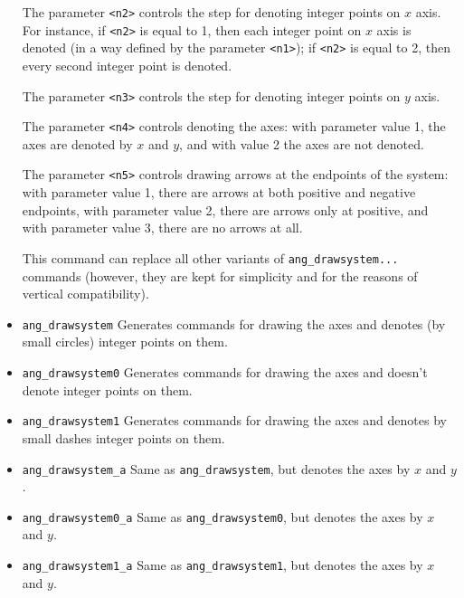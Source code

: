 \documentclass[a4paper]{book}
\begin{document}
\begin{itemize}
        The parameter \verb|<n2>| controls the step for denoting integer points
        on $x$ axis. For instance, if \verb|<n2>| is equal to 1, then each integer
        point on $x$ axis is denoted (in a way defined by the parameter \verb|<n1>|);
        if \verb|<n2>| is equal to 2, then every second integer point is denoted.

        The parameter \verb|<n3>| controls the step for denoting integer points
        on $y$ axis.

        The parameter \verb|<n4>| controls denoting the axes:
        with parameter value 1, the axes are denoted by $x$ and $y$,
        and with value 2 the axes are not denoted.

        The parameter \verb|<n5>| controls drawing arrows at the endpoints of the system:
        with parameter value 1, there are arrows at both positive and negative endpoints,
        with parameter value 2, there are arrows only at positive,
        and with parameter value 3, there are no arrows at all.

        This command can replace all other variants of \verb|ang_drawsystem...| commands
        (however, they are kept for simplicity and for the reasons of vertical compatibility).

\item
\verb|ang_drawsystem|
        Generates commands for drawing the axes and denotes (by small circles)
        integer points on them.

\item
\verb|ang_drawsystem0|
        Generates commands for drawing the axes and doesn't denote
        integer points on them.

\item
\verb|ang_drawsystem1|
        Generates commands for drawing the axes and denotes by small dashes
        integer points on them.

\item
\verb|ang_drawsystem_a|
        Same as \verb|ang_drawsystem|, but denotes the axes by $x$ and $y$.

\item
\verb|ang_drawsystem0_a|
        Same as \verb|ang_drawsystem0|, but denotes the axes by $x$ and $y$.

\item
\verb|ang_drawsystem1_a|
        Same as \verb|ang_drawsystem1|, but denotes the axes by $x$ and $y$.


\end{itemize}
\end{document}
